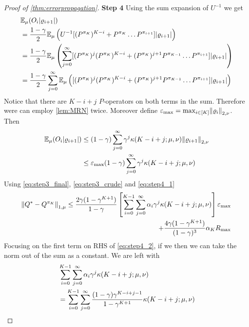 \documentclass{article}
\theoremstyle{definition}
\newcommand{\bb}{\mathbb}
\newcommand{\E}{\bb{E}}
\begin{document}
\begin{proof}[Proof of \cref{thm:errorpropagation}]
  \textbf{Step 4}
  Using the sum expansion of $U^{-1}$ we get
  \begin{align}
    & \E_\mu (O_i \abs{\varrho_{i+1}})
    \\ &= \frac{1 - \gamma}{2} \E_\mu \left( U^{-1} [(P^{\pi_K})^{K-i} +
    P^{\pi_K} \dots P^{\pi_{i+1}}] \abs{\varrho_{i+1}} \right)
    \\ &= \frac{1 - \gamma}{2} \E_\mu \left( \sum_{j=0}^\infty
      [(P^{\pi_K})^j (P^{\pi_K})^{K-i}
      + (P^{\pi_K})^{j+1} P^{\pi_{K-1}} \dots P^{\pi_{i+1}}]
    \abs{\varrho_{i+1}} \right)
    \\ &= \frac{1 - \gamma}{2} \sum_{j=0}^\infty
      \E_\mu \left( [(P^{\pi_K})^j (P^{\pi_K})^{K-i}
      + (P^{\pi_K})^{j+1} P^{\pi_{K-1}} \dots P^{\pi_{i+1}}] 
      \abs{\varrho_{i+1}} \right)
  \end{align}
  Notice that there are $K-i+j$ $P$-operators on both terms
  in the sum. Therefore were can employ \cref{lem:MRN} twice.
  Moreover define
  $\varepsilon_{\max} = \max_{i \in [K]} \norm{\varrho_i}_{2,\nu}$.
  Then
  \begin{align}
    \E_\mu(O_i \abs{\varrho_{i+1}}) &\leq (1-\gamma)
    \sum_{j=0}^\infty \gamma^j \kappa(K-i+j;\mu,\nu) \norm{\varrho_{i+1}}_{2,\nu}
    \notag
    \\ &\leq \varepsilon_{\max} (1-\gamma)
    \sum_{j=0}^\infty \gamma^j \kappa(K-i+j;\mu,\nu) 
    \label{eq:step4_1}
  \end{align} 
  Using \cref{eq:step3_final}, \cref{eq:step3_crude} and \cref{eq:step4_1}
  \begin{equation}
    \begin{split}
    \norm{Q^* - Q^{\pi_K}}_{1,\mu} \leq
    \frac{2 \gamma (1- \gamma^{K+1})}{1-\gamma} 
    \left[ \sum_{i=0}^{K-1} \sum_{j=0}^\infty
    \alpha_i \gamma^j \kappa(K-i+j; \mu, \nu) \right] \varepsilon_{\max}
    \\ + \frac{4 \gamma (1-\gamma^{K+1})}{(1-\gamma)^3} \alpha_K R_{\max}
  \end{split}
  \label{eq:step4_2}
  \end{equation} 
  Focusing on the first term on RHS of \cref{eq:step4_2}, if we 
  then we can take the norm out of the sum as a constant. We are left with
  \begin{align}
    & \sum_{i=0}^{K-1} \sum_{j=0}^\infty \alpha_i \gamma^j \kappa(K-i+j;\mu,\nu)
    \notag
    \\ &= \sum_{i=0}^{K-1} \sum_{j=0}^\infty  
    \frac{(1-\gamma) \gamma^{K-i+j-1}}{1-\gamma^{K+1}} \kappa(K-i+j;\mu,\nu)
    \notag

\end{align}
\end{proof}
\end{document}

